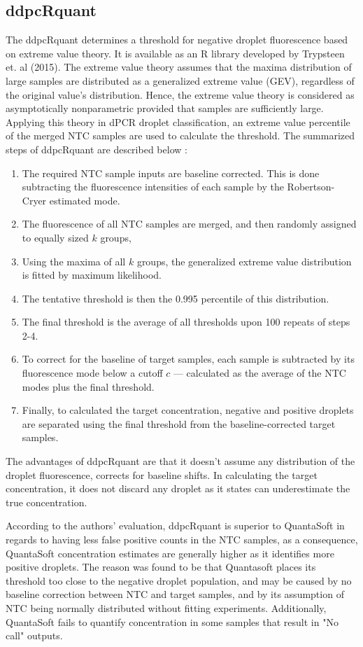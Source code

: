 \subsection{ddpcRquant}
\label{sec:ddpcrquant}
The ddpcRquant determines a threshold for negative droplet fluorescence based on extreme value theory. It is available as an R library developed by Trypsteen et. al (2015). The extreme value theory assumes that the maxima distribution of large samples are distributed as a generalized extreme value (GEV), regardless of the original value's distribution. Hence, the extreme value theory is considered as asymptotically nonparametric provided that samples are sufficiently large. Applying this theory in dPCR droplet classification, an extreme value percentile of the merged NTC samples are used to calculate the threshold. The summarized steps of ddpcRquant are described below :
\begin{enumerate}
    \item The required NTC sample inputs are baseline corrected. This is done subtracting the fluorescence intensities of each sample by the Robertson-Cryer estimated mode.
    \item The fluorescence of all NTC samples are merged, and then randomly assigned to equally sized \(k\) groups, 
    \item Using the maxima of all \(k\) groups, the generalized extreme value distribution is fitted by maximum likelihood.
    \item The tentative threshold is then the 0.995 percentile of this distribution.
    \item The final threshold is the average of all thresholds upon 100 repeats of steps 2-4.
    \item To correct for the baseline of target samples, each sample is subtracted by its fluorescence mode below a cutoff \(c\) — calculated as the average of the NTC modes plus the final threshold.
    \item Finally, to calculated the target concentration, negative and positive droplets are separated using the final threshold from the baseline-corrected target samples. 
\end{enumerate}

The advantages of ddpcRquant are that it doesn't assume any distribution of the droplet fluorescence, corrects for baseline shifts.  In calculating the target concentration, it does not discard any droplet as it states can underestimate the true concentration.

According to the authors' evaluation, ddpcRquant is superior to QuantaSoft in regards to having less false positive counts in the NTC samples, as a consequence, QuantaSoft concentration estimates are generally higher as it identifies more positive droplets. The reason was found to be that Quantasoft places its threshold too close to the negative droplet population, and may be caused by no baseline correction between NTC and target samples, and by its assumption of NTC being normally distributed without fitting experiments. Additionally, QuantaSoft fails to quantify concentration in some samples that result in "No call" outputs.


